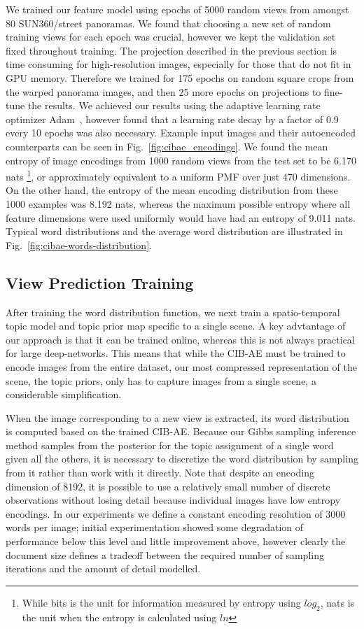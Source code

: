 We trained our feature model using epochs of 5000 random views from amongst 80 SUN360/street panoramas. We found that choosing a new set of random training views for each epoch was crucial, however we kept the validation set fixed throughout training. The projection described in the previous section is time consuming for high-resolution images, especially for those that do not fit in GPU memory. Therefore we trained for 175 epochs on random square crops from the warped panorama images, and then 25 more epochs on projections to fine-tune the results. We achieved our results using the adaptive learning rate optimizer Adam~\citep{KingmaAdam}, however found that a learning rate decay by a factor of 0.9 every 10 epochs was also necessary. Example input images and their autoencoded counterparts can be seen in Fig.~\ref{fig:cibae_encodings}. We found the mean entropy of image encodings from 1000 random views from the test set to be 6.170 nats \footnote{While bits is the unit for information measured by entropy using $log_2$, nats is the unit when the entropy is calculated using $ln$}, or approximately equivalent to a uniform PMF over just 470 dimensions. On the other hand, the entropy of the mean encoding distribution from these 1000 examples was 8.192 nats, whereas the maximum possible entropy where all feature dimensions were used uniformly would have had an entropy of 9.011 nats. Typical word distributions and the average word distribution are illustrated in Fig.~\ref{fig:cibae-words-distribution}.

\subsection{View Prediction Training}
After training the word distribution function, we next train a spatio-temporal topic model and topic prior map specific to a single scene. A key advtantage of our approach is that it can be trained online, whereas this is not always practical for large deep-networks. This means that while the CIB-AE must be trained to encode images from the entire dataset, our most compressed representation of the scene, the topic priors, only has to capture images from a single scene, a considerable simplification.

When the image corresponding to a new view is extracted, its word distribution is computed based on the trained CIB-AE. Because our Gibbs sampling inference method samples from the posterior for the topic assignment of a single word given all the others, it is necessary to discretize the word distribution by sampling from it rather than work with it directly. Note that despite an encoding dimension of 8192, it is possible to use a relatively small number of discrete observations without losing detail because individual images have low entropy encodings. In our experiments we define a constant encoding resolution of 3000 words per image; initial experimentation showed some degradation of performance below this level and little improvement above, however clearly the document size defines a tradeoff between the required number of sampling iterations and the amount of detail modelled.

